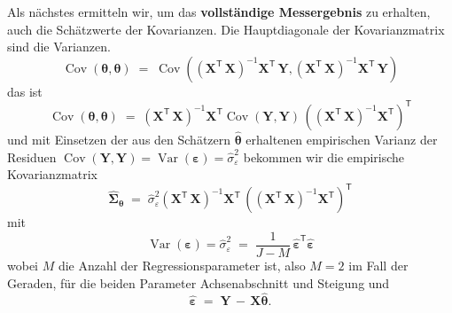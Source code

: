 Als nächstes ermitteln wir, um das \textbf{vollständige
	Messergebnis} zu erhalten, auch die Schätz\-werte der Kovarianzen. Die
Hauptdiagonale der Kovarianzmatrix sind die Varianzen.
\begin{equation}
\operatorname {Cov}( \boldsymbol{\theta},\boldsymbol{\theta} ) \; = \;
\operatorname {Cov} 
\left(\left( \mathbf{X}^\mathsf{T}  \, \mathbf{X} \right)^{-1} \mathbf{X}^\mathsf{T} \, \mathbf{Y}, \left( \mathbf{X}^\mathsf{T}  \, \mathbf{X} \right)^{-1} \mathbf{X}^\mathsf{T} \, \mathbf{Y}\right)
\end{equation}
das ist
\begin{equation}
\operatorname {Cov}( \boldsymbol{\theta}, \boldsymbol{\theta} ) \; = \;
\left( \mathbf{X}^\mathsf{T}  \, \mathbf{X} \right)^{-1} \mathbf{X}^\mathsf{T} \operatorname {Cov} (\mathbf{Y}, \mathbf{Y}) \, \left( \left( \mathbf{X}^\mathsf{T}  \, \mathbf{X} \right)^{-1} \mathbf{X}^\mathsf{T} \right)^\mathsf{T}
\end{equation}
und mit Einsetzen der aus den Schätzern $\boldsymbol{\hat \theta}$ erhaltenen
empirischen Varianz der Residuen 
$\operatorname {Cov} (\mathbf{Y}, \mathbf{Y}) = \operatorname {Var} (\mathbf{\varepsilon}) = \hat \sigma_{\varepsilon}^2$
bekommen wir die empirische Kovarianzmatrix
\begin{equation}
\boldsymbol{\hat \Sigma}_{\boldsymbol{\theta}} \; = \;
\hat \sigma_{\varepsilon}^2
\left( \mathbf{X}^\mathsf{T}  \, \mathbf{X} \right)^{-1} \mathbf{X}^\mathsf{T} \, \left( \left( \mathbf{X}^\mathsf{T}  \, \mathbf{X} \right)^{-1} \mathbf{X}^\mathsf{T} \right)^\mathsf{T}
\end{equation}
mit
$$
\operatorname {Var} (\mathbf{\varepsilon}) = \hat \sigma_{\varepsilon}^2 \; = \;
\frac{1}{J-M} \, \boldsymbol{\hat \varepsilon}^\mathsf{T} \boldsymbol{\hat \varepsilon}
$$
wobei $M$ die Anzahl der Regressionsparameter ist, also $M = 2$ im Fall der Geraden, für die beiden Parameter Achsenabschnitt und Steigung und
$$
\boldsymbol{\hat \varepsilon} \; = \; \mathbf{Y} \, - \, \mathbf{X} \boldsymbol{\hat \theta} .
$$

